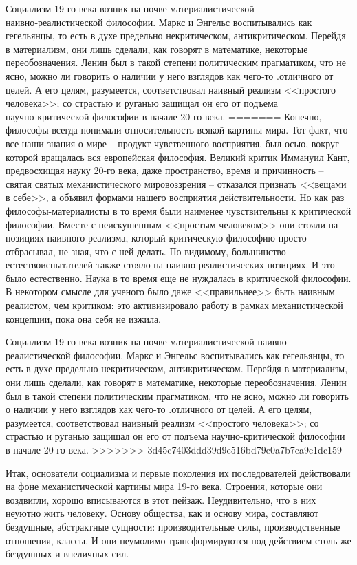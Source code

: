 \documentclass{book}
\begin{document}
Социализм 19‑го века возник на почве материалистической наивно‑реалистической философии. Маркс и Энгельс воспитывались как гегельянцы, то есть в духе предельно некритическом, антикритическом. Перейдя в материализм, они лишь сделали, как говорят в математике, некоторые переобозначения. Ленин был в такой степени политическим прагматиком, что не ясно, можно ли говорить о наличии у него взглядов как чего‑то .отличного от целей. А его целям, разумеется, соответствовал наивный реализм <<простого человека>>; со страстью и руганью защищал он его от подъема научно‑критической фило­софии в начале 20‑го века.
=======
Конечно, философы всегда понимали относительность вся­кой картины мира. Тот факт, что все наши знания о мире -- продукт чувственного восприятия, был осью, вокруг которой вращалась вся европейская философия. Великий критик Иммануил Кант, предвосхищая науку 20-го века, даже пространство, время и причинность -- святая святых механистического мировоззрения -- отказался признать <<вещами в себе>>, а объявил формами нашего восприятия действительности. Но как раз философы-материалисты в то время были наименее чувствительны к критической философии. Вместе с неискушенным <<простым человеком>> они стояли на позициях наивного реализма, который критическую философию просто отбрасывал, не зная, что с ней делать. По-видимому, большинство естествоиспытателей также стояло на наивно-реалистических позициях. И это было естественно. Наука в то время еще не нуждалась в критической философии. В некотором смысле для ученого было даже <<правильнее>> быть наивным реалистом, чем критиком: это активизировало работу в рамках механистической 
концепции, пока она себя не изжила.

Социализм 19-го века возник на почве материалистической наивно-реалистической философии. Маркс и Энгельс воспитывались как гегельянцы, то есть в духе предельно некритическом, антикритическом. Перейдя в материализм, они лишь сделали, как говорят в математике, некоторые переобозначения. Ленин был в такой степени политическим прагматиком, что не ясно, можно ли говорить о наличии у него взглядов как чего-то .отличного от целей. А его целям, разумеется, соответствовал наивный реализм <<простого человека>>; со страстью и руганью защищал он его от подъема научно-критической фило­софии в начале 20-го века.
>>>>>>> 3d45c7403ddd39d9e516bd79e0a7b7ca9e1dc159

Итак, основатели социализма и первые поколения их после­дователей действовали на фоне механистической картины мира 19-го века. Строения, которые они воздвигли, хорошо вписы­ваются в этот пейзаж. Неудивительно, что в них неуютно жить человеку. Основу общества, как и основу мира, составляют бездушные, абстрактные сущности: производительные силы, производственные отношения, классы. И они неумолимо транс­формируются под действием столь же бездушных и внеличных сил.
\end{document}
